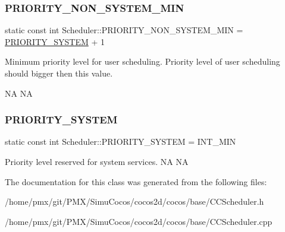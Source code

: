 \subsubsection{\texorpdfstring{P\+R\+I\+O\+R\+I\+T\+Y\+\_\+\+N\+O\+N\+\_\+\+S\+Y\+S\+T\+E\+M\+\_\+\+M\+IN}{PRIORITY\_NON\_SYSTEM\_MIN}}
{\footnotesize\ttfamily static const int Scheduler\+::\+P\+R\+I\+O\+R\+I\+T\+Y\+\_\+\+N\+O\+N\+\_\+\+S\+Y\+S\+T\+E\+M\+\_\+\+M\+IN = \hyperlink{classScheduler_ab81137eee61d428046a59dd036a9bf33}{P\+R\+I\+O\+R\+I\+T\+Y\+\_\+\+S\+Y\+S\+T\+EM} + 1\hspace{0.3cm}{\ttfamily [static]}}

Minimum priority level for user scheduling. Priority level of user scheduling should bigger then this value.

NA  NA \mbox{\label{classScheduler_ab81137eee61d428046a59dd036a9bf33}} 
\subsubsection{\texorpdfstring{P\+R\+I\+O\+R\+I\+T\+Y\+\_\+\+S\+Y\+S\+T\+EM}{PRIORITY\_SYSTEM}}
{\footnotesize\ttfamily static const int Scheduler\+::\+P\+R\+I\+O\+R\+I\+T\+Y\+\_\+\+S\+Y\+S\+T\+EM = I\+N\+T\+\_\+\+M\+IN\hspace{0.3cm}{\ttfamily [static]}}

Priority level reserved for system services.  NA  NA 

The documentation for this class was generated from the following files\+:\begin{DoxyCompactItemize}
\item 
/home/pmx/git/\+P\+M\+X/\+Simu\+Cocos/cocos2d/cocos/base/C\+C\+Scheduler.\+h\item 
/home/pmx/git/\+P\+M\+X/\+Simu\+Cocos/cocos2d/cocos/base/C\+C\+Scheduler.\+cpp\end{DoxyCompactItemize}
